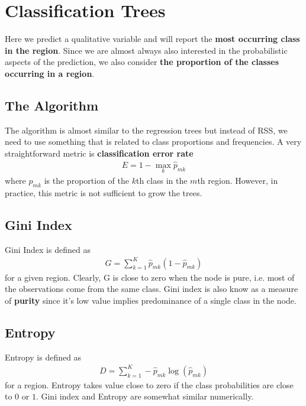 \documentclass[../statistical_learning_notes.tex]{subfiles}
\begin{document}
    \section{Classification Trees}
    Here we predict a qualitative variable and will report the \textbf{most occurring class in the region}. Since we are almost always also interested in the probabilistic aspects of the prediction, we also consider \textbf{the proportion of the classes occurring in a region}.
    

    \subsection{The Algorithm}
    The algorithm is almost similar to the regression trees but instead of RSS, we need to use something that is related to class proportions and frequencies. A very straightforward metric is \textbf{classification error rate}
    \begin{align*}
        E = 1 - \max_{k}\hat{p}_{mk}
    \end{align*}
    where $\hat{p}_{mk}$ is the proportion of the $k$th class in the $m$th region. However, in practice, this metric is not sufficient to grow the trees.

    
    \subsection{Gini Index}
    Gini Index is defined as
    \begin{align*}
        G = \sum_{k=1}^{K} \hat{p}_{mk} (1 - \hat{p}_{mk})
    \end{align*}
    for a given region. Clearly, G is close to zero when the node is pure, i.e. most of the observations come from the same class. Gini index is also know as a measure of \textbf{purity} since it's low value implies predominance of a single class in the node.
    

    \subsection{Entropy}
    Entropy is defined as
    \begin{align*}
        D = \sum_{k=1}^{K} -\hat{p}_{mk} \log(\hat{p}_{mk})
    \end{align*}
    for a region. Entropy takes value close to zero if the class probabilities are close to $0$ or $1$. Gini index and Entropy are somewhat similar numerically.
\end{document}
